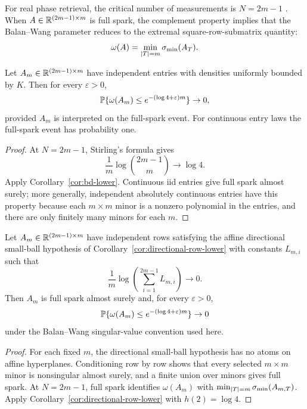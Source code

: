 For real phase retrieval, the critical number of measurements is \(N=2m-1\)
\cite{BalanCasazzaEdidin2006,BandeiraCahillMixonNelson2014}.  When \(A\in\mathbb{R}^{(2m-1)\times m}\) is full
spark, the complement property
\cite{BalanCasazzaEdidin2006,BandeiraCahillMixonNelson2014,ConcaEdidinHeringVinzant2015} implies that
the Balan--Wang parameter \cite{BalanWang2015} reduces to the extremal
square-row-submatrix quantity:
\[
  \omega(A)=\min_{|T|=m}\sigma_{\min}(A_T).
\]

\begin{theorem}\label{thm:pr-lower}
Let \(A_m\in\mathbb{R}^{(2m-1)\times m}\) have independent entries with densities
uniformly bounded by \(K\).  Then for every \(\varepsilon>0\),
\[
  \mathbb{P}\{\omega(A_m)\le e^{-(\log4+\varepsilon)m}\}\to0,
\]
provided \(A_m\) is interpreted on the full-spark event.  For continuous entry
laws the full-spark event has probability one.
\end{theorem}

\begin{proof}
At \(N=2m-1\), Stirling's formula gives
\[
  \frac{1}{m}\log \binom{2m-1}{m}\to\log4.
\]
Apply Corollary~\ref{cor:bd-lower}.  Continuous iid entries give full spark
almost surely; more generally, independent absolutely continuous entries have
this property because each \(m\times m\) minor is a nonzero polynomial in the
entries, and there are only finitely many minors for each \(m\).
\end{proof}

\begin{corollary}\label{cor:pr-directional-lower}
Let \(A_m\in\mathbb{R}^{(2m-1)\times m}\) have independent rows satisfying the affine
directional small-ball hypothesis of Corollary~\ref{cor:directional-row-lower}
with constants \(L_{m,i}\) such that
\[
  \frac1m\log\left(\sum_{i=1}^{2m-1}L_{m,i}\right)\to0.
\]
Then \(A_m\) is full spark almost surely and, for every \(\varepsilon>0\),
\[
  \mathbb{P}\{\omega(A_m)\le e^{-(\log4+\varepsilon)m}\}\to0
\]
under the Balan--Wang singular-value convention used here.
\end{corollary}

\begin{proof}
For each fixed \(m\), the directional small-ball hypothesis has no atoms on
affine hyperplanes.  Conditioning row by row shows that every selected
\(m\times m\) minor is nonsingular almost surely, and a finite union over
minors gives full spark.  At \(N=2m-1\), full spark identifies
\(\omega(A_m)\) with \(\min_{|T|=m}\sigma_{\min}(A_{m,T})\).  Apply
Corollary~\ref{cor:directional-row-lower} with \(h(2)=\log4\).
\end{proof}

